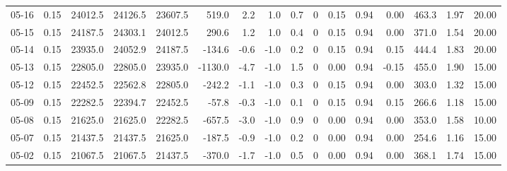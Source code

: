 \begin{threeparttable}
{\begin{tabular}{lrrrrrrrrrrrrrrr}
  05-16 &     0.15 & 24012.5 & 24126.5 & 23607.5 &      519.0 &            2.2 &                      1.0 &                 0.7 &              0 &       0.15 &      0.94 &           0.00 &            463.3 &            1.97 &                  20.00 \\
  05-15 &     0.15 & 24187.5 & 24303.1 & 24012.5 &      290.6 &            1.2 &                      1.0 &                 0.4 &              0 &       0.15 &      0.94 &           0.00 &            371.0 &            1.54 &                  20.00 \\
  05-14 &     0.15 & 23935.0 & 24052.9 & 24187.5 &     -134.6 &           -0.6 &                     -1.0 &                 0.2 &              0 &       0.15 &      0.94 &           0.15 &            444.4 &            1.83 &                  20.00 \\
  05-13 &     0.15 & 22805.0 & 22805.0 & 23935.0 &    -1130.0 &           -4.7 &                     -1.0 &                 1.5 &              0 &       0.00 &      0.94 &          -0.15 &            455.0 &            1.90 &                  15.00 \\
  05-12 &     0.15 & 22452.5 & 22562.8 & 22805.0 &     -242.2 &           -1.1 &                     -1.0 &                 0.3 &              0 &       0.15 &      0.94 &           0.00 &            303.0 &            1.32 &                  15.00 \\
  05-09 &     0.15 & 22282.5 & 22394.7 & 22452.5 &      -57.8 &           -0.3 &                     -1.0 &                 0.1 &              0 &       0.15 &      0.94 &           0.15 &            266.6 &            1.18 &                  15.00 \\
  05-08 &     0.15 & 21625.0 & 21625.0 & 22282.5 &     -657.5 &           -3.0 &                     -1.0 &                 0.9 &              0 &       0.00 &      0.94 &           0.00 &            353.0 &            1.58 &                  10.00 \\
  05-07 &     0.15 & 21437.5 & 21437.5 & 21625.0 &     -187.5 &           -0.9 &                     -1.0 &                 0.2 &              0 &       0.00 &      0.94 &           0.00 &            254.6 &            1.16 &                  15.00 \\
  05-02 &     0.15 & 21067.5 & 21067.5 & 21437.5 &     -370.0 &           -1.7 &                     -1.0 &                 0.5 &              0 &       0.00 &      0.94 &           0.00 &            368.1 &            1.74 &                  15.00 \\

\end{tabular}}
\end{threeparttable}
